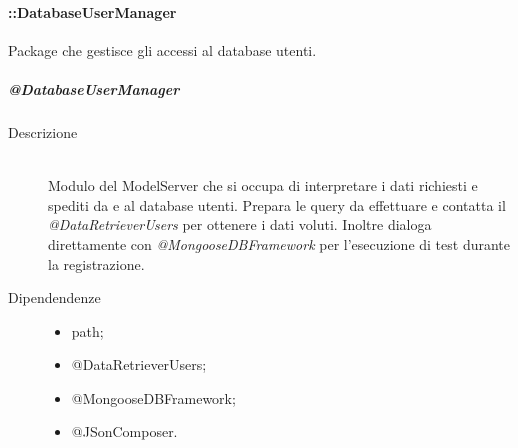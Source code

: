\paragraph{::DatabaseUserManager}
Package che gestisce gli accessi al database utenti.

\subparagraph{@DatabaseUserManager}
\begin{description}
 \item[Descrizione] \hfill \\
Modulo del ModelServer che si occupa di interpretare i dati richiesti e spediti da e al database utenti. 
Prepara le query da effettuare e contatta il \textit{@DataRetrieverUsers} per ottenere i dati voluti. 
Inoltre dialoga direttamente con \textit{@MongooseDBFramework} per l'esecuzione di test durante la registrazione. 
 \item[Dipendendenze] \hfill
 \begin{itemize}
  \item path;
  \item @DataRetrieverUsers;
  \item @MongooseDBFramework;
  \item @JSonComposer.
 \end{itemize}
  

\end{description}
